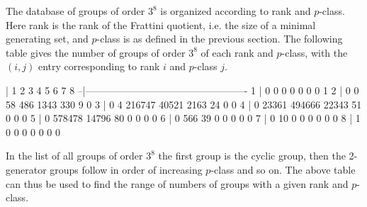 
The database of groups of order $3^{8}$ is organized according to rank and 
$p$-class. Here rank is the rank of the Frattini quotient, i.e. the size of
a minimal generating set, and $p$-class is as defined in the previous
section. The following table gives the number of groups of order $3^{8}$ of
each rank and $p$-class, with the $(i,j)$ entry corresponding to rank $i$
and $p$-class $j$.


\beginexample
  | 1   2        3        4       5      6     7   8
--|-------------------------------------------------
1 | 0   0        0        0       0      0     0   1 
2 | 0   0        58       486     1343   330   9   0 
3 | 0   4        216747   40521   2163   24    0   0 
4 | 0   23361    494666   22343   51     0     0   0
5 | 0   578478   14796    80      0      0     0   0 
6 | 0   566      39       0       0      0     0   0 
7 | 0   10       0        0       0      0     0   0 
8 | 1   0        0        0       0      0     0   0
\endexample

In the list of all groups of order $3^8$ the first group is the cyclic
group, then the 2-generator groups follow in order of increasing $p$-class
and so on. The above table can thus be used to find the range of numbers
of groups with a given rank and $p$-class.


